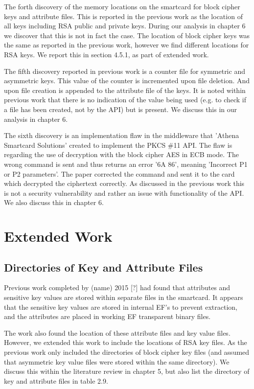 \documentclass[bsc,frontabs,twoside,singlespacing,parskip,deptreport]{infthesis}     %
\begin{document}
The forth discovery of the memory locations on the smartcard for block cipher keys and attribute files. This is reported in the previous work as the location of all keys including RSA public and private keys. During our analysis in chapter 6 we discover that this is not in fact the case. The location of block cipher keys was the same as reported in the previous work, however we find different locations for RSA keys. We report this in section 4.5.1, as part of extended work.

The fifth discovery reported in previous work is a counter file for symmetric and asymmetric keys. This value of the counter is incremented upon file deletion. And upon file creation is appended to the attribute file of the keys. It is noted within previous work that there is no indication of the value being used (e.g. to check if a file has been created, not by the API) but is present. We discuss this in our analysis in chapter 6.

The sixth discovery is an implementation flaw in the middleware that 'Athena Smartcard Solutions' created to implement the PKCS \#11 API. The flaw is regarding the use of decryption with the block cipher AES in ECB mode. The wrong command is sent and thus returns an error '6A 86', meaning 'Incorrect P1 or P2 parameters'. The paper corrected the command and sent it to the card which decrypted the ciphertext correctly. As discussed in the previous work this is not a security vulnerability and rather an issue with functionality of the API. We also discuss this in chapter 6.


 
\section{Extended Work}
\subsection{Directories of Key and Attribute Files}
Previous work completed by (name) 2015 [?] had found that attributes and sensitive key values are stored within separate files in the smartcard. It appears that the sensitive key values are stored in internal EF's to prevent extraction, and the attributes are placed in working EF transparent binary files. 

The work also found the location of these attribute files and key value files. However, we extended this work to include the locations of RSA key files. As the previous work only included the directories of block cipher key files (and assumed that asymmetric key value files were stored within the same directory). We discuss this within the literature review in chapter 5, but also list the directory of key and attribute files in table 2.9.
\end{document}
